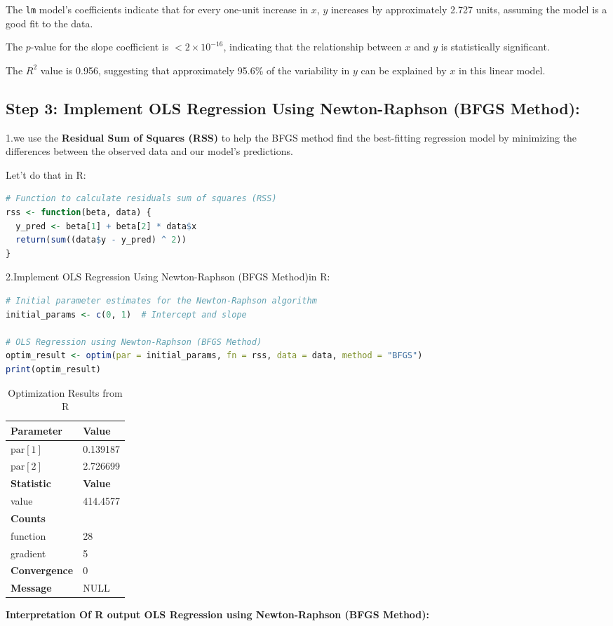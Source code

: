 \documentclass[12pt,letterpaper]{article}
\begin{document}
The \texttt{lm} model's coefficients indicate that for every one-unit increase in \( x \), \( y \) increases by approximately 2.727 units, assuming the model is a good fit to the data.

The \( p \)-value for the slope coefficient is \( < 2 \times 10^{-16} \), indicating that the relationship between \( x \) and \( y \) is statistically significant.

The \( R^2 \) value is 0.956, suggesting that approximately 95.6\% of the variability in \( y \) can be explained by \( x \) in this linear model.

\subsection*{Step 3: Implement OLS Regression Using Newton-Raphson (BFGS Method):}

1.we use the \textbf{Residual Sum of Squares (RSS) }to help the BFGS method find the best-fitting regression model by minimizing the differences between the observed data and our model's predictions.

Let't do that in R: 

\begin{lstlisting}[language=R]
# Function to calculate residuals sum of squares (RSS)
rss <- function(beta, data) {
  y_pred <- beta[1] + beta[2] * data$x
  return(sum((data$y - y_pred) ^ 2))
}
\end{lstlisting}

2.Implement OLS Regression Using Newton-Raphson (BFGS Method)in R:
\begin{lstlisting}[language=R]
# Initial parameter estimates for the Newton-Raphson algorithm
initial_params <- c(0, 1)  # Intercept and slope

# OLS Regression using Newton-Raphson (BFGS Method)
optim_result <- optim(par = initial_params, fn = rss, data = data, method = "BFGS")
print(optim_result)
\end{lstlisting}
\begin{table}[H]
\centering
\begin{tabular}{ll}
\hline
\textbf{Parameter} & \textbf{Value} \\
\hline
\( \text{par}[1] \) & 0.139187 \\
\( \text{par}[2] \) & 2.726699 \\
\hline
\textbf{Statistic} & \textbf{Value} \\
\hline
value & 414.4577 \\
\hline
\textbf{Counts} & \\
\hline
function & 28 \\
gradient & 5 \\
\hline
\textbf{Convergence} & 0 \\
\hline
\textbf{Message} & NULL \\
\hline
\end{tabular}
\caption{Optimization Results from R}
\label{tab:optim_results}
\end{table}
\FloatBarrier %
\textbf{Interpretation Of R output OLS Regression using Newton-Raphson (BFGS Method):}
\end{document}
